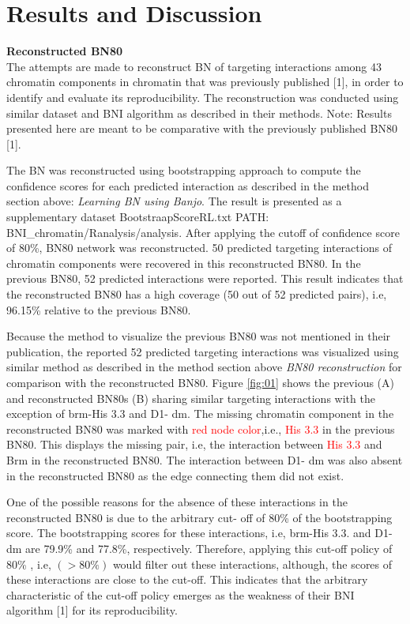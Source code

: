 \documentclass{bioinfo}
\begin{document}
\begin{methods}
\begin{itemize}
\end{itemize}


\end{methods}


\section{Results and Discussion}
\textbf{Reconstructed BN80}\\
The attempts are made to reconstruct BN of targeting interactions among 43 chromatin components in chromatin that was previously published [1], in order to identify and evaluate its reproducibility. The reconstruction was conducted using similar dataset and BNI algorithm as described in their methods. Note: Results presented here are meant to be comparative with the previously published BN80 [1].

The BN was reconstructed using bootstrapping approach to compute the confidence scores for each predicted interaction as described in the method section above: \textit{Learning BN using Banjo}. The result is presented as a supplementary dataset BootstraapScoreRL.txt PATH: BNI\_chromatin/Ranalysis/analysis. After applying the cutoff of confidence score of 80\%, BN80 network was reconstructed. 50 predicted targeting interactions of chromatin components were recovered in this reconstructed BN80. In the previous BN80, 52 predicted interactions were reported. This result indicates that the reconstructed BN80 has a high coverage (50 out of 52 predicted pairs), i.e, 96.15\% relative to the previous BN80.

Because the method to visualize the previous BN80 was not mentioned in their publication, the reported 52 predicted targeting interactions was visualized using similar method as described in the method section above \textit{BN80 reconstruction} for comparison with the reconstructed BN80. Figure \ref{fig:01} shows the previous (A) and reconstructed BN80s (B) sharing similar targeting interactions with the exception of brm-His 3.3 and D1- dm. The missing chromatin component in the reconstructed BN80 was marked with \textcolor{red} {red node color},i.e., \textcolor{red}{His 3.3} in the previous BN80. This displays the missing pair, i.e, the interaction between \textcolor{red}{His 3.3} and Brm in the reconstructed BN80. The interaction between D1- dm was also absent in the reconstructed BN80 as the edge connecting them did not exist. 

One of the possible reasons for the absence of these interactions in the reconstructed BN80 is due to the arbitrary cut- off of 80\% of the bootstrapping score. The bootstrapping scores for these interactions, i.e, brm-His 3.3. and D1-dm are 79.9\% and 77.8\%, respectively. Therefore, applying this cut-off policy of 80\% , i.e, \((> 80\%)\) would filter out these interactions, although, the scores of these interactions are close to the cut-off. This indicates that the arbitrary characteristic of the cut-off policy emerges as the weakness of their BNI algorithm [1] for its reproducibility.
\end{document}
